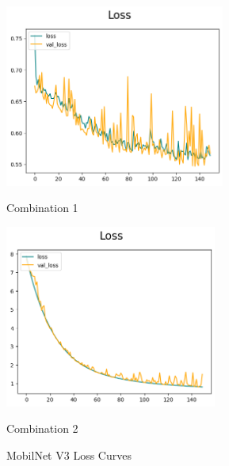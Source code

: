 \begin{figure}[H]
    \centering
    \begin{minipage}[b]{0.49\textwidth}
        \centering
        \includegraphics[width=\textwidth, height=6cm]{Figures/balanced_data/less_data/withoutbn/mn3/loss.png}
        \captionsetup{labelformat=empty}
        \caption{Combination 1}
        \label{fig:u_wo_r_l}
    \end{minipage}
    \hfill
    \begin{minipage}[b]{0.49\textwidth}
        \centering
        \includegraphics[width=\textwidth, height=6cm]{Figures/balanced_data/less_data/withbn/mn3/loss.png}
        \captionsetup{labelformat=empty}
        \caption{Combination 2}
        \label{fig:u_w_r_l}
    \end{minipage}
    \captionsetup{labelformat=default}
    \caption{MobilNet V3 Loss Curves}
\end{figure}

